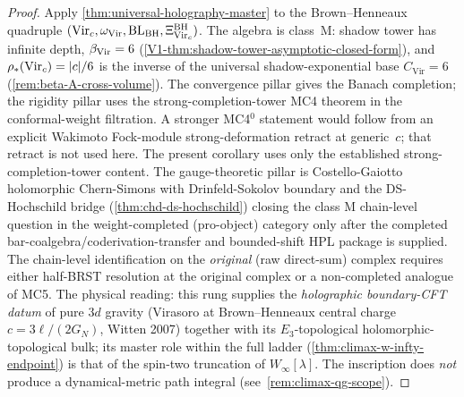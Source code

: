 \begin{proof}
Apply \cref{thm:universal-holography-master} to the Brown--Henneaux
quadruple
\((\mathrm{Vir}_c,\omega_{\mathrm{Vir}},\mathrm{BL}_{\mathrm{BH}},
\Xi_{\mathrm{Vir}_c}^{\mathrm{BH}})\). The algebra is class~M: shadow tower has infinite
depth, $\beta_{\mathrm{Vir}} = 6$ (\cref{V1-thm:shadow-tower-asymptotic-closed-form}),
and $\rho_{*}(\mathrm{Vir}_{c}) = |c|/6$ is the inverse of the universal
shadow-exponential base $C_{\mathrm{Vir}} = 6$
(\cref{rem:beta-A-cross-volume}). The convergence pillar gives the
Banach completion; the rigidity pillar uses the strong-completion-tower
MC4 theorem in the conformal-weight filtration. A stronger
MC4${}^0$ statement would follow from an explicit Wakimoto
Fock-module strong-deformation retract at generic~$c$; that retract is
not used here. The present corollary uses only the established
strong-completion-tower content. The gauge-theoretic pillar is
Costello-Gaiotto holomorphic Chern-Simons with Drinfeld-Sokolov
boundary and the DS-Hochschild bridge
(\cref{thm:chd-ds-hochschild}) closing the class M chain-level
question in the weight-completed (pro-object) category only after the
completed bar-coalgebra/coderivation-transfer and bounded-shift HPL
package is supplied. The
chain-level identification on the \emph{original} (raw direct-sum)
complex requires either half-BRST resolution at the original
complex or a non-completed analogue of MC5. The physical reading:
this rung supplies the
\emph{holographic boundary-CFT datum} of pure $3d$ gravity
(Virasoro at Brown--Henneaux central charge $c = 3\ell/(2G_{N})$,
Witten 2007) together with its $E_{3}$-topological
holomorphic-topological bulk; its master role within the full
ladder (\cref{thm:climax-w-infty-endpoint}) is that of the
spin-two truncation of $W_{\infty}[\lambda]$. The inscription
does \emph{not} produce a dynamical-metric path integral
(see~\cref{rem:climax-qg-scope}).
\end{proof}

